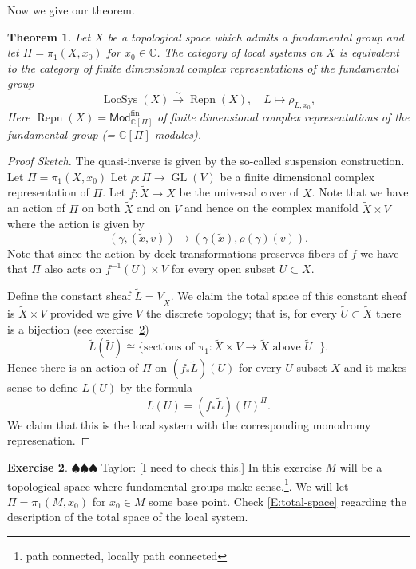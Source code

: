 \documentclass[12pt]{book}
\newcommand{\taylor}[1]{{\color{blue} \sf $\spadesuit\spadesuit\spadesuit$ Taylor: [#1]}}
\numberwithin{equation}{section}
\newtheorem{theorem}{Theorem}[subsection]
\theoremstyle{definition}
\newtheorem{exercise}[theorem]{Exercise}
\theoremstyle{remark}
\newcommand{\CC}{\mathbb{C}}
\newcommand{\GL}{\operatorname{GL}}
\newcommand{\LocSys}{\operatorname{LocSys}}
\newcommand{\Mod}{\mathsf{Mod}}
\newcommand{\fin}{\operatorname{fin}}
\newcommand{\Repn}{\operatorname{Repn}}
\begin{document}
Now we give our theorem.
\begin{theorem}
	Let $X$ be a topological space which admits a fundamental group and let $\Pi = \pi_1(X,x_0)$ for $x_0\in \CC$. 
	The category of local systems on $X$ is equivalent to the category of finite dimensional complex representations of the fundamental group 
	$$ \LocSys(X) \xrightarrow{\sim} \Repn(X), \quad L \mapsto \rho_{L,x_0},$$
	Here $\Repn(X)=\Mod_{\CC[\Pi]}^{\fin}$ of finite dimensional complex representations of the fundamental group (= $\CC[\Pi]$-modules).
\end{theorem}
\begin{proof}[Proof Sketch]
	The quasi-inverse is given by the so-called suspension construction. 
	Let $\Pi = \pi_1(X,x_0)$
	Let $\rho: \Pi \to \GL(V)$ be a finite dimensional complex representation of $\Pi$.
	Let $f: \widetilde{X} \to X$ be the universal cover of $X$. 
	Note that we have an action of $\Pi$ on both $\widetilde{X}$ and on $V$ and hence on the complex manifold $\widetilde{X}\times V$ where the action is given by 
	$$(\gamma, (\widetilde{x},v))\to (\gamma(\widetilde{x}), \rho(\gamma)(v)).$$
	Note that since the action by deck transformations preserves fibers of $f$ we have that $\Pi$ also acts on $f^{-1}(U) \times V$ for every open subset $U \subset X$. 
	
	Define the constant sheaf $ \widetilde{L} = \underline{V}_{\widetilde{X}}.$
	We claim the total space of this constant sheaf is $\widetilde{X}\times V$ provided we give $V$ the discrete topology; that is, for every $\widetilde{U} \subset \widetilde{X}$ there is a bijection (see exercise~\ref{EX:total-space})
	\begin{equation}\label{E:total-space}
	\widetilde{L}(\widetilde{U})  \cong \lbrace \mbox{sections of $\pi_1: \widetilde{X}\times V \to \widetilde{X}$ above $\widetilde{U}$ } \rbrace.
	\end{equation}
	Hence there is an action of  $\Pi$ on $(f_*\widetilde{L})(U)$ for every $U$ subset $X$ and it makes sense to define $L(U)$ by the formula 
	$$ L(U) = (f_*\widetilde{L})(U)^{\Pi}. $$
	We claim that this is the local system with the corresponding monodromy represenation.
\end{proof}

\begin{exercise}\label{EX:total-space}
	\taylor{I need to check this.}
	In this exercise $M$ will be a topological space where fundamental groups make sense.\footnote{path connected, locally path connected}. 
	We will let $\Pi = \pi_1(M,x_0)$ for $x_0\in M$ some base point.  	
 Check \eqref{E:total-space} regarding the description of the total space of the local system.
\end{exercise}
\end{document}
